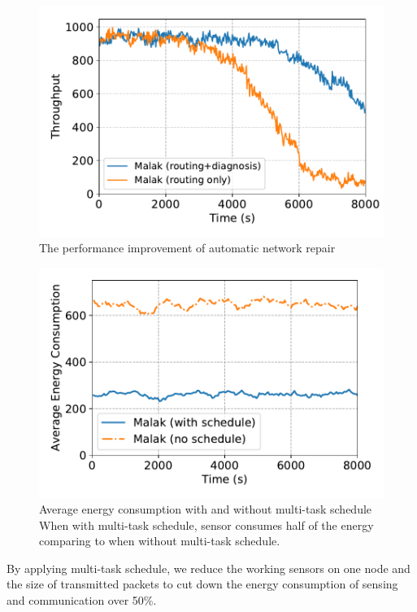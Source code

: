 \begin{figure}[htbp]
	\centering
	\includegraphics[width=.95\columnwidth]{Figure/diagnosis}
	\vspace{-0.1in}
	\caption{The performance improvement of automatic network repair
		\textnormal{
		}}
	\label{fig:diagnosis}
\end{figure}



\begin{figure}[htbp]
	\centering
	\includegraphics[width=.95\columnwidth]{Figure/multitask_energy}
	\vspace{-0.1in}
	\caption{Average energy consumption with and without multi-task schedule
		\textnormal{When with multi-task schedule, sensor consumes half of the energy
			comparing to when without multi-task schedule.}}
	\label{fig:multitask_energy}
\end{figure}

By applying multi-task schedule, we reduce the working sensors on one node and
the size of transmitted packets to cut down the energy consumption of sensing
and communication over 50\%.

